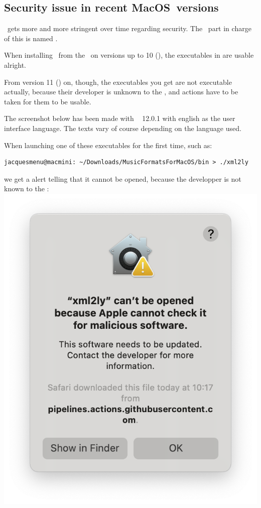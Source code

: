 \subsection{Security issue in recent MacOS\texttrademark\ versions}

\MacOS\ gets more and more stringent over time regarding security. The \OS\ part in charge of this is named \Gatekeeper. 

When installing \mf\ from the \repo\ on versions up to 10 (), the executables in  are usable alright.

From version 11 () on, though, the executables you get are not executable actually, because their developer is unknown to the \OS, and actions have to be taken for them to be usable.

The screenshot below has been made with \MacOS\  12.0.1 with english as the user interface language. The texts vary of course depending on the language used.

When launching one of these executables for the first time, such as:
\begin{lstlisting}[language=Terminal]
jacquesmenu@macmini: ~/Downloads/MusicFormatsForMacOS/bin > ./xml2ly
\end{lstlisting}
we get a alert telling that it cannot be opened, because the developper is not known to the \OS:\\
\includegraphics[scale=0.35]{../graphics/MacOSMaliciousSoftwareAlert.png}

